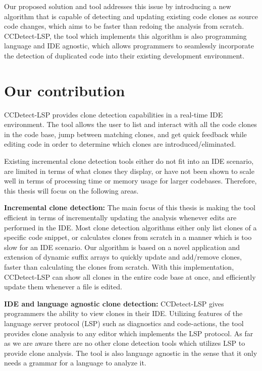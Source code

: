 Our proposed solution and tool addresses this issue by introducing a new algorithm that is
capable of detecting and updating existing code clones as source code changes, which aims
to be faster than redoing the analysis from scratch. CCDetect-LSP, the tool which
implements this algorithm is also programming language and IDE agnostic, which allows
programmers to seamlessly incorporate the detection of duplicated code into their existing
development environment.

\section{Our contribution}

CCDetect-LSP provides clone detection capabilities in a real-time IDE environment. The
tool allows the user to list and interact with all the code clones in the code base, jump
between matching clones, and get quick feedback while editing code in order to determine
which clones are introduced/eliminated.

Existing incremental clone detection tools either do not fit into an IDE scenario, are
limited in terms of what clones they display, or have not been shown to scale well in
terms of processing time or memory usage for larger codebases. Therefore, this thesis will
focus on the following areas.

\textbf{Incremental clone detection:} The main focus of this thesis is making the tool
efficient in terms of incrementally updating the analysis whenever edits are performed in
the IDE. Most clone detection algorithms either only list clones of a specific code
snippet, or calculates clones from scratch in a manner which is too slow for an IDE
scenario. Our algorithm is based on a novel application and extension of dynamic suffix
arrays to quickly update and add/remove clones, faster than calculating the clones from
scratch. With this implementation, CCDetect-LSP can show all clones in the entire code
base at once, and efficiently update them whenever a file is edited.

\textbf{IDE and language agnostic clone detection:} CCDetect-LSP gives programmers the
ability to view clones in their IDE. Utilizing features of the language server protocol
(LSP) such as diagnostics and code-actions, the tool provides clone analysis to any editor
which implements the LSP protocol. As far as we are aware there are no other clone
detection tools which utilizes LSP to provide clone analysis. The tool is also language
agnostic in the sense that it only needs a grammar for a language to analyze it.

